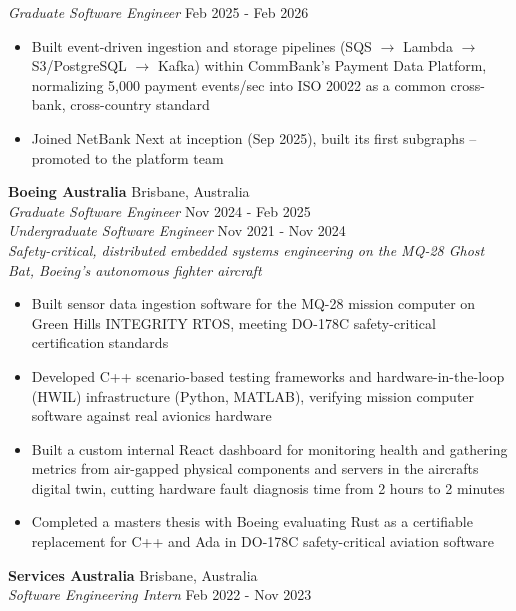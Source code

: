\documentclass[a4paper]{article}
\begin{document}
\textit{Graduate Software Engineer} \hfill Feb 2025 - Feb 2026\\
\vspace{-2mm}
\begin{itemize} \itemsep -1pt
    \item Built event-driven ingestion and storage pipelines (SQS $\rightarrow$ Lambda $\rightarrow$ S3/PostgreSQL $\rightarrow$ Kafka) within CommBank's Payment Data Platform, normalizing 5,000 payment events/sec into ISO 20022 as a common cross-bank, cross-country standard
    \item Joined NetBank Next at inception (Sep 2025), built its first subgraphs -- promoted to the platform team
\end{itemize}
\vspace{-2mm}
\textbf{Boeing Australia} \hfill Brisbane, Australia\\
\textit{Graduate Software Engineer} \hfill Nov 2024 - Feb 2025\\
\textit{Undergraduate Software Engineer} \hfill Nov 2021 - Nov 2024\\
{\small \textit{Safety-critical, distributed embedded systems engineering on the MQ-28 Ghost Bat, Boeing's autonomous fighter aircraft}}\\
\vspace{-2mm}
\begin{itemize} \itemsep -1pt
    \item Built sensor data ingestion software for the MQ-28 mission computer on Green Hills INTEGRITY RTOS, meeting DO-178C safety-critical certification standards
    \item Developed C++ scenario-based testing frameworks and hardware-in-the-loop (HWIL) infrastructure (Python, MATLAB), verifying mission computer software against real avionics hardware
    \item Built a custom internal React dashboard for monitoring health and gathering metrics from air-gapped physical components and servers in the aircraft\textquotesingle{}s digital twin, cutting hardware fault diagnosis time from 2 hours to 2 minutes
    \item Completed a master\textquotesingle{}s thesis with Boeing evaluating Rust as a certifiable replacement for C++ and Ada in DO-178C safety-critical aviation software
\end{itemize}
\vspace{-2mm}
\textbf{Services Australia} \hfill Brisbane, Australia\\
\textit{Software Engineering Intern} \hfill Feb 2022 - Nov 2023\\
\end{document}
